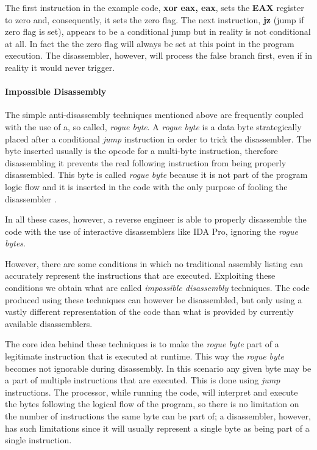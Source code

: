 \documentclass[pdfa%
,cucitura%
]{toptesi}
\begin{document}
The first instruction in the example code, \textbf{xor eax, eax}, sets the \textbf{EAX} register to zero and, consequently, it sets the zero flag. The next instruction, \textbf{jz} (jump if zero flag is set), appears to be a conditional jump but in reality is not conditional at all. In fact the the zero flag will always be set at this point in the program execution. The disassembler, however, will process the false branch first, even if in reality it would never trigger.

\paragraph{Impossible Disassembly}
The simple anti-disassembly techniques mentioned above are frequently coupled with the use of a, so called, \textit{rogue byte}. A \textit{rogue byte} is a data byte strategically placed after a conditional \textit{jump} instruction in order to trick the disassembler. The byte inserted usually is the opcode for a multi-byte instruction, therefore disassembling it prevents the real following instruction from being properly disassembled. This byte is called \textit{rogue byte} because it is not part of the program logic flow and it is inserted in the code with the only purpose of fooling the disassembler \cite{SikorskiPMA}.

In all these cases, however, a reverse engineer is able to properly disassemble the code with the use of interactive disassemblers like IDA Pro, ignoring the \textit{rogue bytes}.

However, there are some conditions in which no traditional assembly listing can accurately represent the instructions that are executed. Exploiting these conditions we obtain what are called \textit{impossible disassembly} techniques. The code produced using these techniques can however be disassembled, but only using a vastly different representation of the code than what is provided by currently available disassemblers.

The core idea behind these techniques is to make the \textit{rogue byte} part of a legitimate instruction that is executed at runtime. This way the \textit{rogue byte} becomes not ignorable during disassembly. In this scenario any given byte may be a part of multiple instructions that are executed. This is done using \textit{jump} instructions. The processor, while running the code, will interpret and execute the bytes following the logical flow of the program, so there is no limitation on the number of instructions the same byte can be part of; a disassembler, however, has such limitations since it will usually represent a single byte as being part of a single instruction.
\end{document}
